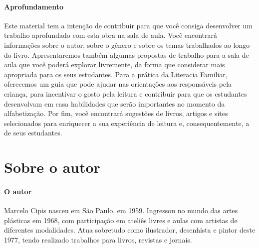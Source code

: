 \documentclass[11pt]{extarticle}
\begin{document}
\paragraph{Aprofundamento} 
Este material tem a intenção de contribuir para que você consiga desenvolver um trabalho aprofundado 
com esta obra na sala de aula. Você encontrará informações sobre o autor, sobre 
o gênero e sobre os temas trabalhados ao longo do livro. Apresentaremos também 
algumas propostas de trabalho para a sala de aula que você poderá explorar livremente, 
da forma que considerar mais apropriada para os seus estudantes. Para a prática 
da Literacia Familiar, oferecemos um guia que pode ajudar nas orientações aos 
responsáveis pela criança, para incentivar o gosto pela leitura e contribuir para 
que os estudantes desenvolvam em casa habilidades que serão importantes no momento 
da alfabetização. Por fim, você encontrará sugestões de livros, artigos e sites 
selecionados para enriquecer a sua experiência de leitura e, 
consequentemente, a de seus estudantes.


\section{Sobre o autor}

\paragraph{O autor} 
Marcelo Cipis nasceu em São Paulo, em 1959. 
Ingressou no mundo das artes plásticas em 1968, com participação em ateliês 
livres e aulas com artistas de diferentes modalidades. Atua sobretudo como 
ilustrador, desenhista e pintor deste 1977, tendo realizado trabalhos para 
livros, revistas e jornais.

\reversemarginpar
\marginparwidth=5cm

\end{document}
